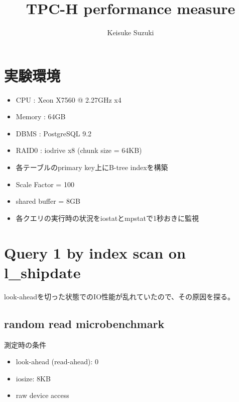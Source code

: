 \documentclass[11pt,a4paper]{jsarticle}
\title{TPC-H performance measure}
\author{Keisuke Suzuki}
\begin{document}
\maketitle
\section{実験環境}
\begin{itemize}
 \item CPU : Xeon X7560 @ 2.27GHz x4
 \item Memory : 64GB
 \item DBMS : PostgreSQL 9.2
 \item RAID0 : iodrive x8 (chunk size = 64KB)
 \item 各テーブルのprimary key上にB-tree indexを構築
 \item Scale Factor = 100
 \item shared buffer = 8GB
 \item 各クエリの実行時の状況をiostatとmpstatで1秒おきに監視
\end{itemize}

\clearpage
\section{Query 1 by index scan on l\_shipdate}
look-aheadを切った状態でのIO性能が乱れていたので、その原因を探る。

\subsection{random read microbenchmark}
測定時の条件
\begin{itemize}
 \item look-ahead (read-ahead): 0
 \item iosize: 8KB
 \item raw device access
\end{itemize}
\end{document}
